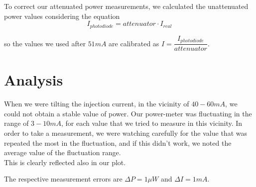 \documentclass[openany,11pt,a4paper]{book}
\begin{document}
To correct our attenuated power measurements, we calculated the unattenuated power values considering the equation 
\begin{equation}
I_{photodiode} = attenuator \cdot I_{real}
\end{equation}

so the values we used after $51 mA$ are calibrated as $I =  \dfrac{I_{photodiode}}{attenuator}  $.





\section*{Analysis}

When we were tilting the injection current, in the vicinity of $40-60 mA$, we could not obtain a stable value of power. Our power-meter was fluctuating in the range of $3-10 mA$, for each value that we tried to measure in this vicinity.
In order to take a measurement, we were watching carefully for the value that was repeated the most in the fluctuation, and if this didn't work, we noted the average value of the fluctuation range.\\
This is clearly reflected also in our plot.

The respective measurement errors are $\Delta P=1 \mu W$ and $\Delta I=1mA$.\\
\end{document}
